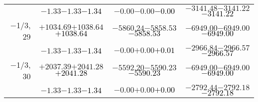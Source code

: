 \documentclass[compress]{beamer}
\begin{document}
\begin{frame}
{\begin{tabular}{r | c | c | c}
           & $-1.33$\hspace{0.1 cm}$-1.33$\hspace{0.1 cm}\textcolor{black}{$-1.34$} & $-0.00$\hspace{0.1 cm}$-0.00$\hspace{0.1 cm}\textcolor{black}{$-0.00$} & $-3141.48$\hspace{0.1 cm}$-3141.22$\hspace{0.1 cm}\textcolor{black}{$-3141.22$} \\
$-$1/3, 29 & $+1034.69$\hspace{0.1 cm}$+1038.64$\hspace{0.1 cm}\textcolor{black}{$+1038.64$} & $-5860.24$\hspace{0.1 cm}$-5858.53$\hspace{0.1 cm}\textcolor{black}{$-5858.53$} & $-6949.00$\hspace{0.1 cm}$-6949.00$\hspace{0.1 cm}\textcolor{black}{$-6949.00$} \\
           & $-1.33$\hspace{0.1 cm}$-1.33$\hspace{0.1 cm}\textcolor{black}{$-1.34$} & $-0.00$\hspace{0.1 cm}$+0.00$\hspace{0.1 cm}\textcolor{black}{$+0.01$} & $-2966.84$\hspace{0.1 cm}$-2966.57$\hspace{0.1 cm}\textcolor{black}{$-2966.57$} \\
$-$1/3, 30 & $+2037.39$\hspace{0.1 cm}$+2041.28$\hspace{0.1 cm}\textcolor{black}{$+2041.28$} & $-5592.20$\hspace{0.1 cm}$-5590.23$\hspace{0.1 cm}\textcolor{black}{$-5590.23$} & $-6949.00$\hspace{0.1 cm}$-6949.00$\hspace{0.1 cm}\textcolor{black}{$-6949.00$} \\
           & $-1.33$\hspace{0.1 cm}$-1.33$\hspace{0.1 cm}\textcolor{black}{$-1.34$} & $-0.00$\hspace{0.1 cm}$+0.00$\hspace{0.1 cm}\textcolor{black}{$+0.00$} & $-2792.44$\hspace{0.1 cm}$-2792.18$\hspace{0.1 cm}\textcolor{black}{$-2792.18$} \\
\end{tabular}}
\end{frame}
\end{document}
